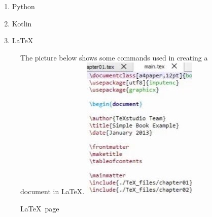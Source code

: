 \documentclass{article}
\begin{document}
 \begin{enumerate}
    \item Python 
    \item Kotlin
    \item \LaTeX\
 \end{enumerate}
\begin{figure}
The picture below shows some commands used in creating a document in LaTeX.
\includegraphics{demo}
\caption{\LaTeX\ page}
\end{figure}
\end{document}
